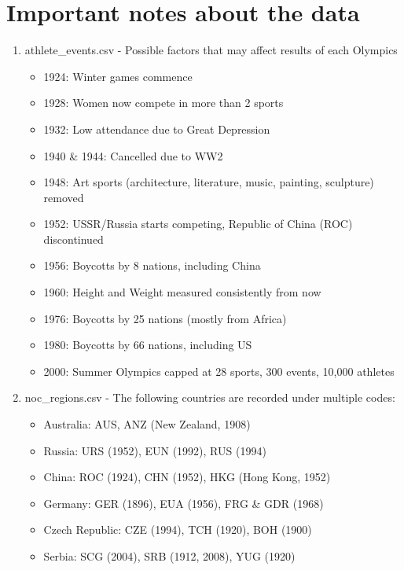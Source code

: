 \documentclass[a4 paper, 12pt]{article}
\begin{document}
\pagebreak
\appendix
\addappheadtotoc
\appendixpage
\section{Important notes about the data}
    \begin{enumerate}
        \item athlete\_events.csv - Possible factors that may affect results of each Olympics
            \begin{itemize}
                \item 1924: Winter games commence
                \item 1928: Women now compete in more than 2 sports
                \item 1932: Low attendance due to Great Depression
                \item 1940 \& 1944: Cancelled due to WW2
                \item 1948: Art sports (architecture, literature, music, painting, sculpture) removed
                \item 1952: USSR/Russia starts competing, Republic of China (ROC) discontinued
                \item 1956: Boycotts by 8 nations, including China
                \item 1960: Height and Weight measured consistently from now
                \item 1976: Boycotts by 25 nations (mostly from Africa)
                \item 1980: Boycotts by 66 nations, including US
                \item 2000: Summer Olympics capped at 28 sports, 300 events, 10,000 athletes                
            \end{itemize}

        \item noc\_regions.csv - The following countries are recorded under multiple codes:
            
        \begin{itemize}
                \item Australia: AUS, ANZ (New Zealand, 1908)
                \item Russia: URS (1952), EUN (1992), RUS (1994)
                \item China: ROC (1924), CHN (1952), HKG (Hong Kong, 1952)
                \item Germany: GER (1896), EUA (1956), FRG \& GDR (1968)
                \item Czech Republic: CZE (1994), TCH (1920), BOH (1900)
                \item Serbia: SCG (2004), SRB (1912, 2008), YUG (1920)                    
            \end{itemize}  

    \end{enumerate}
\end{document}
